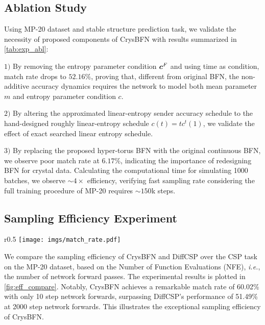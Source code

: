 \subsection{Ablation Study}\label{sec:exp_ablation}

Using MP-20 dataset and stable structure prediction task, we validate the necessity of proposed components of CrysBFN with results summarized in \cref{tab:exp_abl}: 

$1)$ By removing the entropy parameter condition $\bm{c}^F$ and using time as condition, match rate drops to $52.16\%$, proving that, different from original BFN, the non-additive accuracy dynamics requires the network to model both mean parameter $m$ and entropy parameter condition $c$. 

$2)$ By altering the approximated linear-entropy sender accuracy schedule to the hand-designed roughly linear-entropy schedule $c(t)=t c^{t}(1)$, we validate the effect of exact searched linear entropy schedule. 

$3)$ By replacing the proposed hyper-torus BFN with the original continuous BFN, we observe poor match rate at $6.17\%$, indicating the importance of redesigning BFN for crystal data. Calculating the computational time for simulating 1000 batches, we observe $\sim4\times$ efficiency, verifying fast sampling rate considering the full training procedure of MP-20 requires $\sim 150$k steps.



\subsection{Sampling Efficiency Experiment}
\begin{wrapfigure}{r}{0.5\textwidth} %
\vskip -0.4in
    \centering
    \texttt{[image: imgs/match\_rate.pdf]} 
    \caption{Experimental results on MP-20 with different Number of Function Evaluations (NFE) \emph{i.e.} number of network forward passes. } %
    \label{fig:eff_compare}
\vskip -0.9in
\end{wrapfigure}
We compare the sampling efficiency of CrysBFN and DiffCSP over the CSP task on the MP-20 dataset, based on the Number of Function Evaluations (NFE), \textit{i.e.}, the number of network forward passes. The experimental results is plotted in \cref{fig:eff_compare}. Notably, CrysBFN achieves a remarkable match rate of 60.02\% with only 10 step network forwards, surpassing DiffCSP's performance of 51.49\% at 2000 step network forwards. This illustrates the exceptional sampling efficiency of CrysBFN.  




